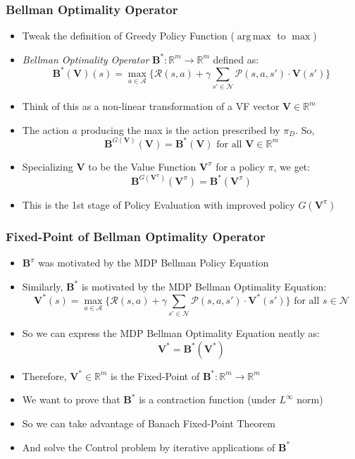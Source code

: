 \documentclass[handout]{beamer}
\DeclareMathOperator*{\argmax}{arg\,max}
\newcommand{\bvpi}{\bm{V}^{\pi}}
\newcommand{\bvs}{\bm{V}^*}
\newcommand{\bbpi}{\bm{B}^{\pi}}
\newcommand{\bbs}{\bm{B}^*}
\newcommand{\bv}{\bm{V}}
\begin{document}
\begin{frame}
\frametitle{Bellman Optimality Operator}
\pause
\begin{itemize}[<+->]
\item Tweak the definition of Greedy Policy Function ($\argmax$ to $\max$)
\item {\em Bellman Optimality Operator} $\bbs: \mathbb{R}^m \rightarrow \mathbb{R}^m$ defined as:
$$\bbs(\bv)(s) = \max_{a\in \mathcal{A}} \{\mathcal{R}(s,a) + \gamma \sum_{s' \in \mathcal{N}} \mathcal{P}(s,a,s') \cdot \bv(s')\}$$
\item Think of this as a non-linear transformation of a VF vector $\bv \in \mathbb{R}^m$
\item The action $a$ producing the max is the action prescribed by $\pi_D$. So,
$$\bm{B}^{G(\bv)}(\bv) = \bbs(\bv) \text{ for all } \bv \in \mathbb{R}^m$$
\item Specializing $\bv$ to be the Value Function $\bvpi$ for a policy $\pi$, we get:
$$\bm{B}^{G(\bvpi)}(\bvpi) = \bbs(\bvpi)$$
\item This is the 1st stage of Policy Evaluation with improved policy $G(\bvpi)$
\end{itemize}
\end{frame}

\begin{frame}
\frametitle{Fixed-Point of Bellman Optimality Operator}
\pause
\begin{itemize}[<+->]
\item $\bbpi$ was motivated by the MDP Bellman Policy Equation
\item Similarly, $\bbs$ is motivated by the MDP Bellman Optimality Equation:
$$\bvs(s) = \max_{a \in \mathcal{A}} \{ \mathcal{R}(s,a) + \gamma \sum_{s' \in \mathcal{N}} \mathcal{P}(s,a,s') \cdot \bvs(s') \} \text{ for all } s \in \mathcal{N}$$
\item So we can express the MDP Bellman Optimality Equation neatly as:
$$\bvs = \bbs(\bvs)$$
\item Therefore, $\bvs \in \mathbb{R}^m$ is the Fixed-Point of $\bbs: \mathbb{R}^m \rightarrow \mathbb{R}^m$
\item We want to prove that $\bbs$ is a contraction function (under $L^{\infty}$ norm)
\item So we can take advantage of Banach Fixed-Point Theorem
\item And solve the Control problem by iterative applications of $\bbs$
\end{itemize}
\end{frame}
\end{document}
